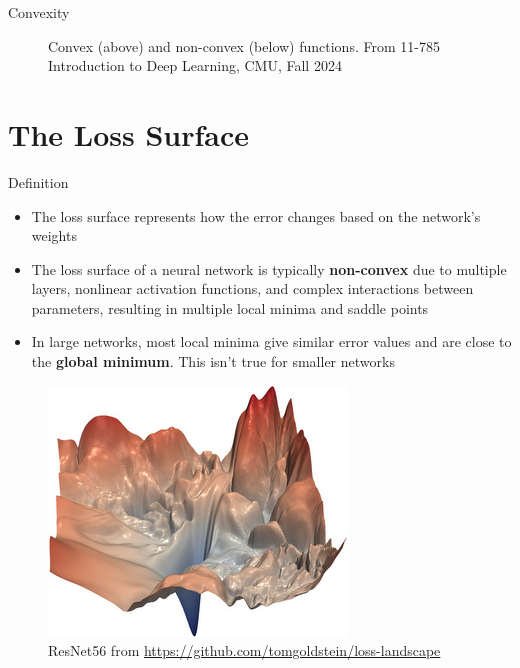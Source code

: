 \documentclass[serif, aspectratio=169]{beamer}
\begin{document}
\begin{frame}{Convexity}
\begin{minipage}{0.5\linewidth}
\begin{figure}[h]
            \caption{\footnotesize Convex (above) and non-convex (below) functions. From 11-785 Introduction to Deep Learning, CMU, Fall 2024}
        \end{figure}
    \end{minipage}
\end{frame}

\section{The Loss Surface}
\begin{frame}{Definition}
\begin{minipage}{0.5\linewidth}
    \begin{itemize}
        \item The loss surface represents how the error changes based on the network's weights
        \item The loss surface of a neural network is typically \textbf{non-convex} due to multiple layers, nonlinear activation functions, and complex interactions between parameters, resulting in multiple local minima and saddle points
        \item In large networks, most local minima give similar error values and are close to the \textbf{global minimum}. This isn't true for smaller networks
    \end{itemize}
\end{minipage}%
\begin{minipage}{0.5\linewidth}
    \begin{figure}[h]
        \centering
        \includegraphics[height=.5\textheight]{pic/resnet56_noshort_small.jpg}
        \caption{\footnotesize ResNet56 from \url{https://github.com/tomgoldstein/loss-landscape}}
    \end{figure}
\end{minipage}
\end{frame}
\end{document}
